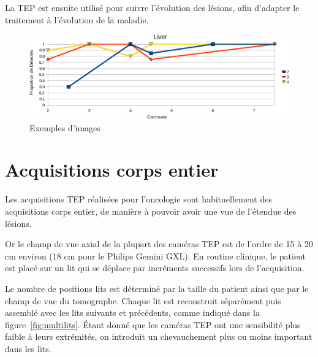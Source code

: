La TEP est ensuite utilisé pour suivre l'évolution des lésions, afin d'adapter le traitement à l'évolution de la maladie.

\begin{figure}[h!]
\begin{center}
\includegraphics[width=15cm]{images/calibrationFoie_crop}
\end{center}
\caption{Exemples d'images } 
\label{fig:exTEP}
\end{figure}


\section{Acquisitions corps entier}


Les acquisitions TEP réalisées pour l'oncologie sont habituellement des acquisitions corps entier, de manière à pouvoir avoir une vue de l'étendue des lésions.

Or le champ de vue axial de la plupart des caméras TEP est de l'ordre de 15 à 20 cm environ (18 cm pour le Philips Gemini GXL). En routine clinique, le patient est placé sur un lit qui se déplace par incréments successifs lors de l'acquisition.

Le nombre de positions lits est déterminé par la taille du patient ainsi que par le champ de vue du tomographe. Chaque lit est reconstruit séparément puis assemblé avec les lits suivants et précédents, comme indiqué dans la figure~\ref{fig:multilits}. \'Etant donné que les caméras TEP ont une sensibilité plus faible à leurs extrémités, on introduit un chevauchement plus ou moins important dans les lits.

